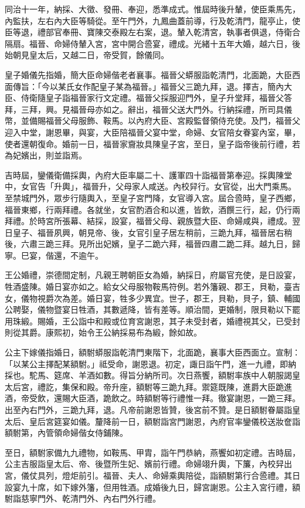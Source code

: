 \begin{pinyinscope}
同治十一年，納採、大徵、發冊、奉迎，悉準成式。惟屆時後升輦，使臣乘馬先，內監扶，左右內大臣等騎從。至午門外，九鳳曲蓋前導，行及乾清門，龍亭止，使臣等退，禮部官奉冊、寶陳交泰殿左右案，退。輦入乾清宮，執事者俱退，侍衛合隔扇。福晉、命婦侍輦入宮，宮中開合巹宴，禮成。光緒十五年大婚，越六日，後始朝見皇太后，又越二日，帝受賀，餘儀同。

皇子婚儀先指婚，簡大臣命婦偕老者襄事。福晉父蟒服詣乾清門，北面跪，大臣西面傳旨：「今以某氏女作配皇子某為福晉。」福晉父三跪九拜，退。擇吉，簡內大臣、侍衛隨皇子詣福晉家行文定禮。福晉父採服迎門外，皇子升堂拜，福晉父答拜，三拜，興。見福晉母亦如之。辭出，福晉父送大門外。行納採禮，所司具儀幣，並備賜福晉父母服飾、鞍馬。以內府大臣、宮殿監督領侍充使。及門，福晉父迎入中堂，謝恩畢，與宴，大臣陪福晉父宴中堂，命婦、女官陪女眷宴內室，畢，使者還朝復命。婚前一日，福晉家齎妝具陳皇子宮，至日，皇子詣帝後前行禮，若為妃嬪出，則並詣焉。

吉時屆，鑾儀衛備採輿，內府大臣率屬二十、護軍四十詣福晉第奉迎。採輿陳堂中，女官告「升輿」，福晉升，父母家人咸送。內校舁行。女官從，出大門乘馬。至禁城門外，眾步行隨輿入，至皇子宮門降，女官導入宮。屆合巹時，皇子西鄉，福晉東鄉，行兩拜禮。各就坐，女官酌酒合和以進，皆飲，酒饌三行，起，仍行兩拜禮。於時宮所張幕、結採，設宴，福晉父母、親族暨大臣、命婦咸與，禮成。翌日皇子、福晉夙興，朝見帝、後，女官引皇子居左稍前，三跪九拜，福晉居右稍後，六肅三跪三拜。見所出妃嬪，皇子二跪六拜，福晉四肅二跪二拜。越九日，歸寧。巳宴，偕還，不逾午。

王公婚禮，崇德間定制，凡親王聘朝臣女為婚，納採日，府屬官充使，是日設宴，牲酒盛陳。婚日宴亦如之。給女父母服物鞍馬符例。若外籓親、郡王，貝勒，臺吉女，儀物視爵次為差。婚日宴，牲多少異宜。世子，郡王，貝勒，貝子，鎮、輔國公聘娶，儀物暨宴日牲酒，其數遞降，皆有差等。順治間，更婚制，限貝勒以下罷用珠緞。賜婚，王公詣中和殿或位育宮謝恩，其子未受封者，婚禮視其父，已受封則從其爵。康熙初，始令王公納採易布為緞，餘如故。

公主下嫁儀指婚日，額駙蟒服詣乾清門東階下，北面跪，襄事大臣西面立。宣制：「以某公主擇配某額駙。」祗受命，謝恩退。初定，諏日詣午門，進一九禮，即納採也。駝馬、筵席、羊酒如數。得旨分納所司。次日燕饗，額駙率族中人朝服謁皇太后宮，禮訖，集保和殿。帝升座，額駙等三跪九拜。禦筵既陳，進爵大臣跪進酒，帝受飲，還賜大臣酒，跪飲之。時額駙等行禮惟一拜。徹宴謝恩，一跪三拜。出至內右門外，三跪九拜，退。凡帝前謝恩皆贊，後宮前不贊。是日額駙眷屬詣皇太后、皇后宮筵宴如儀。釐降前一日，額駙詣宮門謝恩，內府官率鑾儀校送妝奩詣額駙第，內管領命婦偕女侍鋪陳。

至日，額駙家備九九禮物，如鞍馬、甲胄，詣午門恭納，燕饗如初定禮。吉時屆，公主吉服詣皇太后、帝、後暨所生妃、嬪前行禮。命婦翊升輿，下簾，內校舁出宮，儀仗具列，燈炬前引。福晉、夫人、命婦乘輿陪從，詣額駙第行合巹禮。其日設宴九十席，如下嫁外籓，但用牲酒。成婚後九日，歸宮謝恩。公主入宮行禮，額駙詣慈寧門外、乾清門外、內右門外行禮。


\end{pinyinscope}

